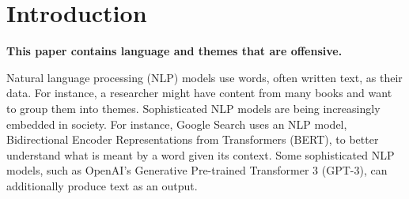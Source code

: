 \documentclass{bmcart}
\begin{document}
\begin{frontmatter}
\begin{abstractbox}
\begin{keyword}
\end{keyword}


\end{abstractbox}
%

\end{frontmatter}




\section{Introduction}\label{introduction}

\textbf{This paper contains language and themes that are offensive.}

Natural language processing (NLP) models use words, often written text, as their data. For instance, a researcher might have content from many books and want to group them into themes. Sophisticated NLP models are being increasingly embedded in society. For instance, Google Search uses an NLP model, Bidirectional Encoder Representations from Transformers (BERT), to better understand what is meant by a word given its context. Some sophisticated NLP models, such as OpenAI's Generative Pre-trained Transformer 3 (GPT-3), can additionally produce text as an output.
\end{document}
